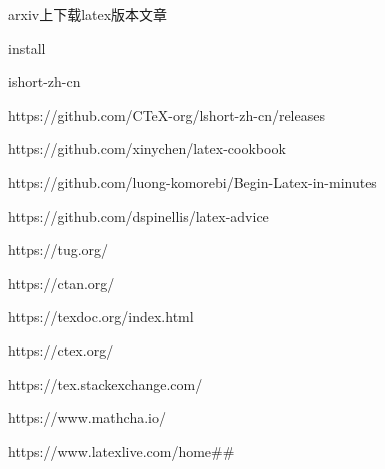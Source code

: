 \documentclass[11pt]{ctexart}
\begin{document}
arxiv上下载latex版本文章\cite{wen2020fighting}

install







ishort-zh-cn

https://github.com/CTeX-org/lshort-zh-cn/releases

https://github.com/xinychen/latex-cookbook

https://github.com/luong-komorebi/Begin-Latex-in-minutes

https://github.com/dspinellis/latex-advice

https://tug.org/

https://ctan.org/

https://texdoc.org/index.html

https://ctex.org/

https://tex.stackexchange.com/

https://www.mathcha.io/

https://www.latexlive.com/home\#\#



\end{document}
